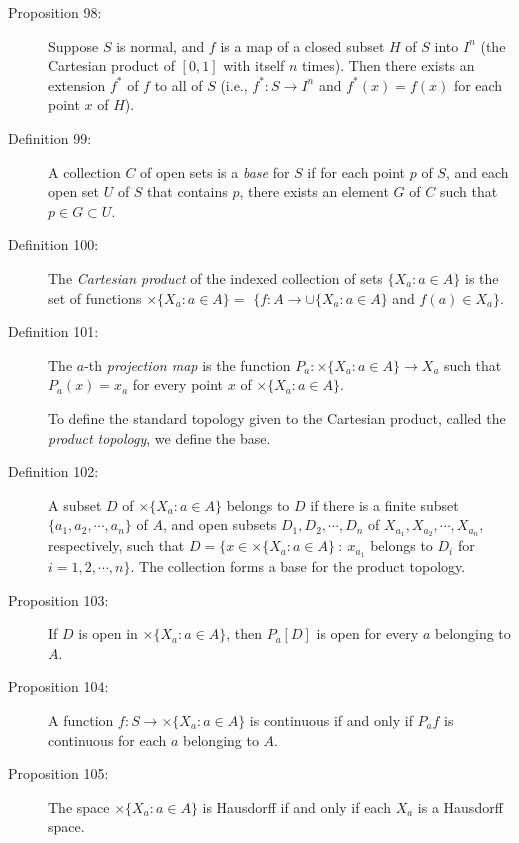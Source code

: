 \documentclass{article}
\begin{document}
\begin{description}
  \item[Proposition 98:] Suppose $S$ is normal, and $f$ is a map of a closed subset $H$ of $S$ into $I^n$ (the Cartesian product of $[0,1]$ with itself $n$ times). Then there exists an extension $f^*$ of $f$ to all of $S$ (i.e., $f^*: S \rightarrow I^n$ and $f^*(x) = f(x)$ for each point $x$ of $H$).

  \item[Definition 99:] A collection $C$ of open sets is a \emph{base} for $S$ if for each point $p$ of $S$, and each open set $U$ of $S$ that contains $p$, there exists an element $G$ of $C$ such that $p \in G \subset U$.

  \item[Definition 100:] The \emph{Cartesian product} of the indexed collection of sets $\{ X_a : a \in A \}$ is the set of functions  $\times \{ X_a : a \in A \} =$ $\{ f: A \rightarrow \cup \{ X_a: a \in A \}$ and $f(a) \in X_a \}$.

  \item[Definition 101:] The $a$-th \emph{projection map} is the function $P_a: \times \{ X_a: a \in A \} \rightarrow X_a$ such that $P_a(x) = x_a$ for every point $x$ of $\times \{ X_a: a \in A \}$.

  \item[] To define the standard topology given to the Cartesian product, called the \emph{product topology}, we define the base.

  \item[Definition 102:] A subset $D$ of $\times \{ X_a: a \in A \}$ belongs to $D$ if there is a finite subset $\{ a_1, a_2, \cdots , a_n \}$ of $A$, and open subsets $D_1, D_2, \cdots , D_n$ of $X_{a_1}, X_{a_2}, \cdots , X_{a_n}$, respectively, such that $D = \{ x \in \times \{ X_a: a \in A \}\ :\ x_{a_1}$ belongs to $D_i$ for $i = 1, 2, \cdots , n \}$. The collection forms a base for the product topology.

  \item[Proposition 103:] If $D$ is open in $\times \{ X_a: a \in A \}$, then $P_a[D]$ is open for every $a$ belonging to $A$.

  \item[Proposition 104:] A function $f: S \rightarrow \times \{ X_a: a \in A \}$ is continuous if and only if $P_af$ is continuous for each $a$ belonging to $A$.

  \item[Proposition 105:] The space $\times \{ X_a: a \in A \}$ is Hausdorff if and only if each $X_a$ is a Hausdorff space.


\end{description}
\end{document}
